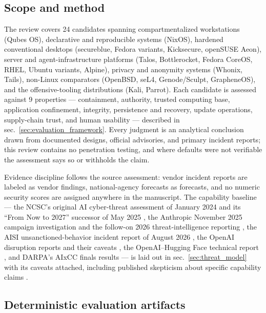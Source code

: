 \documentclass[
  english,
  9pt,
]{extarticle}
\begin{document}
\subsection{Scope and method}\label{scope-and-method}

The review covers 24 candidates spanning compartmentalized workstations
(Qubes OS), declarative and reproducible systems (NixOS), hardened
conventional desktops (secureblue, Fedora variants, Kicksecure, openSUSE
Aeon), server and agent-infrastructure platforms (Talos, Bottlerocket,
Fedora CoreOS, RHEL, Ubuntu variants, Alpine), privacy and anonymity
systems (Whonix, Tails), non-Linux comparators (OpenBSD, seL4,
Genode/Sculpt, GrapheneOS), and the offensive-tooling distributions
(Kali, Parrot). Each candidate is assessed against 9 properties ---
containment, authority, trusted computing base, application confinement,
integrity, persistence and recovery, update operations, supply-chain
trust, and human usability --- described in
sec.~\ref{sec:evaluation_framework}. Every judgment is an analytical
conclusion drawn from documented designs, official advisories, and
primary incident reports; this review contains no penetration testing,
and where defaults were not verifiable the assessment says so or
withholds the claim.

Evidence discipline follows the source assessment: vendor incident
reports are labeled as vendor findings, national-agency forecasts as
forecasts, and no numeric security scores are assigned anywhere in the
manuscript. The capability baseline --- the NCSC's original AI
cyber-threat assessment of January 2024 \citep{ncsc_ai_threat_2024} and
its ``From Now to 2027'' successor of May 2025
\citep{ncsc_ai_cyber_threat}, the Anthropic November 2025 campaign
investigation and the follow-on 2026 threat-intelligence reporting
\citep{anthropic_campaign_report, anthropic_ti_sept_2026}, the AISI
unsanctioned-behavior incident report of August 2026
\citep{aisi_incident_report}, the OpenAI disruption reports and their
caveats \citep{openai_disruption_oct_2025, openai_disruption_2026}, the
OpenAI--Hugging Face technical report \citep{openai_hf_incident}, and
DARPA's AIxCC finals results \citep{darpa_aixcc_finals} --- is laid out
in sec.~\ref{sec:threat_model} with its caveats attached, including
published skepticism about specific capability claims
\citep{arstechnica_gtg_skepticism}.

\subsection{Deterministic evaluation
artifacts}\label{deterministic-evaluation-artifacts}
\end{document}
